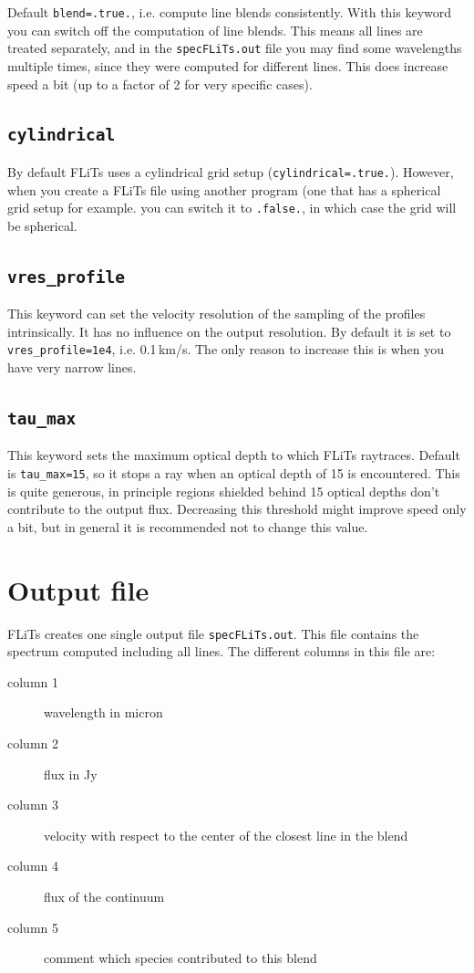 \documentclass[12pt]{article}
\begin{document}
Default \texttt{blend=.true.}, i.e. compute line blends consistently. With this keyword you can switch off the computation of line blends. This means all lines are treated separately, and in the \texttt{specFLiTs.out} file you may find some wavelengths multiple times, since they were computed for different lines. This does increase speed a bit (up to a factor of 2 for very specific cases).

\subsection*{\texttt{cylindrical}}

By default FLiTs uses a cylindrical grid setup (\texttt{cylindrical=.true.}). However, when you create a FLiTs file using another program (one that has a spherical grid setup for example. you can switch it to \texttt{.false.}, in which case the grid will be spherical.

\subsection*{\texttt{vres\_profile}}

This keyword can set the velocity resolution of the sampling of the profiles intrinsically. It has no influence on the output resolution. By default it is set to \texttt{vres\_profile=1e4}, i.e. 0.1\,km/s. The only reason to increase this is when you have very narrow lines.

\subsection*{\texttt{tau\_max}}

This keyword sets the maximum optical depth to which FLiTs raytraces. Default is \texttt{tau\_max=15}, so it stops a ray when an optical depth of 15 is encountered. This is quite generous, in principle regions shielded behind 15 optical depths don't contribute to the output flux. Decreasing this threshold might improve speed only a bit, but in general it is recommended not to change this value.

\section{Output file}

FLiTs creates one single output file \texttt{specFLiTs.out}. This file contains the spectrum computed including all lines. The different columns in this file are:
\begin{description}
\item[column 1] wavelength in micron
\item[column 2] flux in Jy
\item[column 3] velocity with respect to the center of the closest line in the blend
\item[column 4] flux of the continuum
\item[column 5] comment which species contributed to this blend
\end{description}
\end{document}
